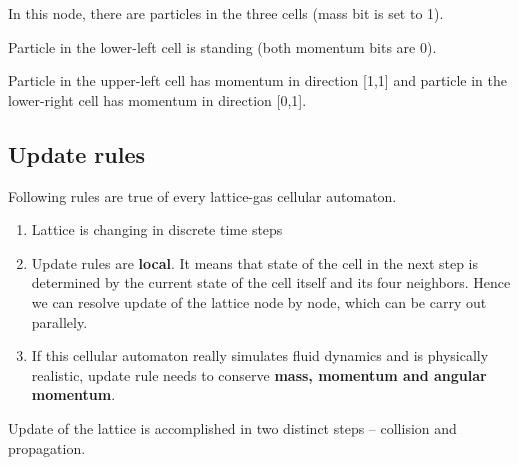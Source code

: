 In this node, there are particles in the three cells (mass bit is set to 1).

Particle in the lower-left cell is standing (both momentum bits are 0).

Particle in the upper-left cell has momentum in direction [1,1] and particle in the lower-right cell has momentum in direction [0,1].

\subsection{Update rules}
Following rules are true of every lattice-gas cellular automaton.

\begin{enumerate}
\item Lattice is changing in discrete time steps
\item Update rules are \textbf{local}. It means that state of the cell in the next step is determined by the current state of the cell itself and its four neighbors. Hence we can resolve update of the lattice node by node, which can be carry out parallely.
\item If this cellular automaton really simulates fluid dynamics and is physically realistic, update rule needs to conserve \textbf{mass, momentum and angular momentum}.
\end{enumerate}

Update of the lattice is accomplished in two distinct steps -- collision and propagation.

